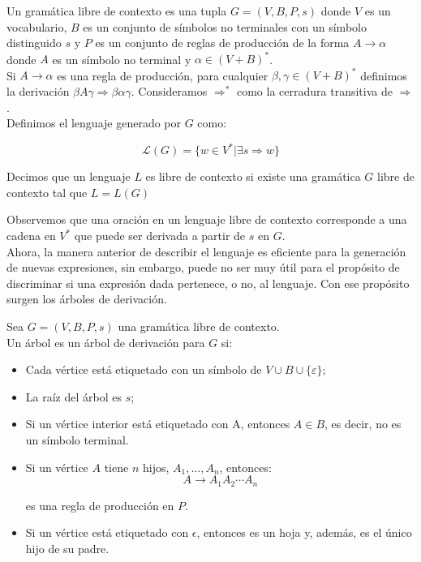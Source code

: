 \documentclass[../main.tex]{subfiles}
\begin{document}
\begin{dfn}
	
	Un gramática libre de contexto es una tupla $G=(V,B,P,s)$ donde $V$ es un vocabulario, $B$ es un conjunto de símbolos no terminales con un símbolo distinguido $s$ y $P$ es un conjunto de reglas de producción de la forma $A \to \alpha$ donde $A$ es un símbolo no terminal y $\alpha \in (V+B)^*$.\\
	Si $A \to \alpha$ es una regla de producción, para cualquier $\beta, \gamma \in (V+B)^*$ definimos la derivación 
	$\beta A \gamma \Rightarrow \beta \alpha \gamma$. 
	Consideramos $\Rightarrow ^*$ como la  cerradura transitiva de $\Rightarrow$. \\
	
	Definimos el lenguaje generado por $G$ como:
	
	$$ \mathcal{L}(G)= \{ w \in V^* | \exists s \Rightarrow w \} $$
	
	Decimos que un lenguaje $L$ es libre de contexto si existe una gramática $G$ libre de contexto tal que $L=L(G)$

\end{dfn}

Observemos que una oración en un lenguaje libre de contexto corresponde a una cadena en $V^*$ que puede ser derivada a partir de $s$ en $G$. \\

Ahora, la manera anterior de describir el lenguaje es eficiente para la generación de nuevas expresiones, sin embargo, puede no ser muy útil para el propósito de discriminar si una expresión dada pertenece, o no, al lenguaje. Con ese propósito surgen los árboles de derivación. 

\begin{dfn}
	
	Sea $G=(V,B,P,s)$ una gramática libre de contexto. \\
	Un árbol es un árbol de derivación para $G$ si:
	
	\begin{itemize}
		\item Cada vértice está etiquetado con un símbolo de $V \cup B \cup \{ \varepsilon \}$; 
		\item La raíz del árbol es $s$; 
		\item Si un vértice interior está etiquetado con A, entonces $A \in B$, es decir, no es un símbolo terminal. 
		\item Si un vértice $A$ tiene $n$ hijos, $A_1, \dots, A_n$, entonces:
		$$A \to A_1A_2 \cdots A_n$$
		
		es una regla de producción en $P$. \\
		\item Si un vértice está etiquetado con $\epsilon$, entonces es un hoja y, además, es el único hijo de su padre.
	\end{itemize}
	
	
\end{dfn}
\end{document}

